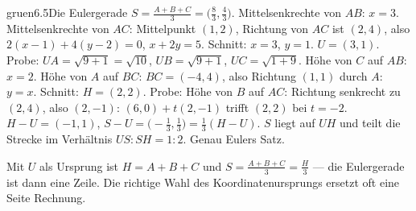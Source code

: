 \begin{loesungkarte}{gruen}{6.5}{Die Eulergerade}
$S = \frac{A + B + C}3 = \bigl(\frac83, \frac43\bigr)$.
Mittelsenkrechte von $AB$: $x = 3$. Mittelsenkrechte von $AC$: Mittelpunkt $(1, 2)$, Richtung von $AC$ ist $(2, 4)$, also $2(x - 1) + 4(y - 2) = 0$, $x + 2y = 5$. Schnitt: $x = 3$, $y = 1$. $U = (3, 1)$. Probe: $UA = \sqrt{9 + 1} = \sqrt{10}$, $UB = \sqrt{9 + 1}$, $UC = \sqrt{1 + 9}$. \checkmark
{}
Höhe von $C$ auf $AB$: $x = 2$. Höhe von $A$ auf $BC$: $BC = (-4, 4)$, also Richtung $(1, 1)$ durch $A$: $y = x$. Schnitt: $H = (2, 2)$. Probe: Höhe von $B$ auf $AC$: Richtung senkrecht zu $(2, 4)$, also $(2, -1)$: $(6, 0) + t(2, -1)$ trifft $(2, 2)$ bei $t = -2$. \checkmark
{}
$H - U = (-1, 1)$, $S - U = \bigl(-\frac13, \frac13\bigr) = \frac13(H - U)$. $S$ liegt auf $UH$ und teilt die Strecke im Verhältnis $US : SH = 1 : 2$. Genau Eulers Satz.
\begin{mitnehmen}\kastentext
Mit $U$ als Ursprung ist $H = A + B + C$ und $S = \frac{A + B + C}3 = \frac H3$ --- die Eulergerade ist dann eine Zeile. Die richtige Wahl des Koordinatenursprungs ersetzt oft eine Seite Rechnung.
\end{mitnehmen}
\end{loesungkarte}

